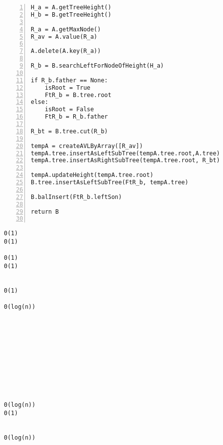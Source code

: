 \begin{minipage}{0.5\linewidth}
\begin{Verbatim}[frame=topline,numbers=left,label=Codice,framesep=5mm]
H_a = A.getTreeHeight()
H_b = B.getTreeHeight()

R_a = A.getMaxNode()
R_av = A.value(R_a)

A.delete(A.key(R_a))

R_b = B.searchLeftForNodeOfHeight(H_a)

if R_b.father == None:
    isRoot = True
    FtR_b = B.tree.root
else:
    isRoot = False
    FtR_b = R_b.father

R_bt = B.tree.cut(R_b)

tempA = createAVLByArray([R_av])
tempA.tree.insertAsLeftSubTree(tempA.tree.root,A.tree)
tempA.tree.insertAsRightSubTree(tempA.tree.root, R_bt)

tempA.updateHeight(tempA.tree.root)
B.tree.insertAsLeftSubTree(FtR_b, tempA.tree)

B.balInsert(FtR_b.leftSon)

return B
    
  \end{Verbatim}
\end{minipage}\hfill
\begin{minipage}{0.39\linewidth}
\begin{Verbatim}
0(1)
0(1)

0(1)
0(1)


0(1)

0(log(n))











0(log(n))
0(1)


0(log(n))
\end{Verbatim}
\end{minipage}
\newline
\newline